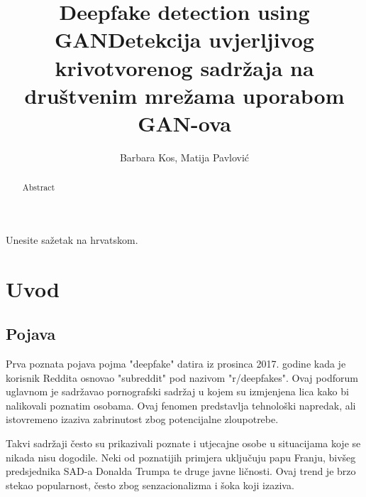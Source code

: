\documentclass[seminarski, times, utf8]{fer}
\title{Deepfake detection using GAN}
\title{Detekcija uvjerljivog krivotvorenog sadržaja na društvenim mrežama uporabom GAN-ova}
\author{Barbara Kos, Matija Pavlović}
\date{}
\date{}
\begin{document}
\maketitle



\begin{sazetak}
  Unesite sažetak na hrvatskom.
\end{sazetak}

\begin{kljucnerijeci}
 
\end{kljucnerijeci}

\begin{abstract}
  Abstract
\end{abstract}

\begin{keywords}
 
\end{keywords}


\tableofcontents


\chapter{Uvod}
\label{pog:uvod}
\section{Pojava}
Prva poznata pojava pojma "deepfake" datira iz prosinca 2017. godine kada je korisnik Reddita osnovao "subreddit" pod nazivom "r/deepfakes".%
Ovaj podforum uglavnom je sadržavao pornografski sadržaj u kojem su izmjenjena lica kako bi nalikovali poznatim osobama. Ovaj fenomen predstavlja tehnološki napredak, ali istovremeno izaziva zabrinutost zbog potencijalne zloupotrebe.

Takvi sadržaji često su prikazivali poznate i utjecajne osobe u situacijama koje se nikada nisu dogodile. Neki od poznatijih primjera uključuju papu Franju, bivšeg predsjednika SAD-a Donalda Trumpa te druge javne ličnosti. Ovaj trend je brzo stekao popularnost, često zbog senzacionalizma i šoka koji izaziva.
\end{document}
